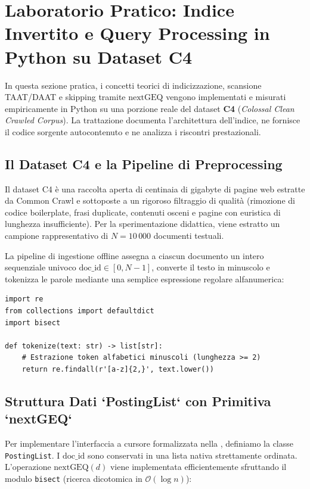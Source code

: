 \FloatBarrier

\FloatBarrier
\section{Laboratorio Pratico: Indice Invertito e Query Processing in Python su Dataset C4}
\label{sec:laboratorio-python-c4}

In questa sezione pratica, i concetti teorici di indicizzazione, scansione TAAT/DAAT e skipping tramite $\text{nextGEQ}$ vengono implementati e misurati empiricamente in Python su una porzione reale del dataset \textbf{C4} (\textit{Colossal Clean Crawled Corpus}). La trattazione documenta l'architettura dell'indice, ne fornisce il codice sorgente autocontenuto e ne analizza i riscontri prestazionali.

\FloatBarrier
\subsection{Il Dataset C4 e la Pipeline di Preprocessing}
\label{subsec:c4-dataset-preprocessing}
Il dataset C4 \`e una raccolta aperta di centinaia di gigabyte di pagine web estratte da Common Crawl e sottoposte a un rigoroso filtraggio di qualit\`a (rimozione di codice boilerplate, frasi duplicate, contenuti osceni e pagine con euristica di lunghezza insufficiente). Per la sperimentazione didattica, viene estratto un campione rappresentativo di $N = 10\,000$ documenti testuali.

La pipeline di ingestione offline assegna a ciascun documento un intero sequenziale univoco $\text{doc\_id} \in [0, N-1]$, converte il testo in minuscolo e tokenizza le parole mediante una semplice espressione regolare alfanumerica:
\begin{lstlisting}[style=pythoncode, caption={Ingestione del dataset C4 e tokenizzazione in Python.}, label={lst:c4-tokenization}]
import re
from collections import defaultdict
import bisect

def tokenize(text: str) -> list[str]:
    # Estrazione token alfabetici minuscoli (lunghezza >= 2)
    return re.findall(r'[a-z]{2,}', text.lower())
\end{lstlisting}

\FloatBarrier
\subsection{Struttura Dati `PostingList` con Primitiva `nextGEQ`}
\label{subsec:python-posting-list}
Per implementare l'interfaccia a cursore formalizzata nella , definiamo la classe \texttt{PostingList}. I $\text{doc\_id}$ sono conservati in una lista nativa strettamente ordinata. L'operazione $\text{nextGEQ}(d)$ viene implementata efficientemente sfruttando il modulo \texttt{bisect} (ricerca dicotomica in $\mathcal{O}(\log n)$):

